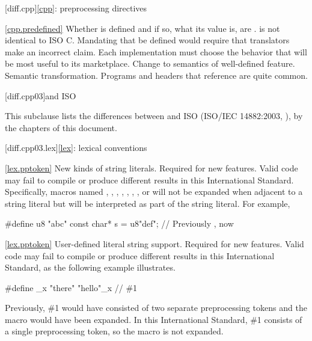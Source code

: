 [diff.cpp]{\ref{cpp}: preprocessing directives}

\ref{cpp.predefined}
\change Whether  is defined and if so, what its value is, are
.
\rationale
\Cpp is not identical to ISO C\@.
Mandating that 
be defined would require that translators make an incorrect claim.
Each implementation must choose the behavior that will be most
useful to its marketplace.
\effect
Change to semantics of well-defined feature.
\difficulty
Semantic transformation.
\howwide
Programs and headers that reference  are
quite common.

[diff.cpp03]{\Cpp and ISO \CppIII}

\pnum
{}%
This subclause lists the differences between \Cpp and
ISO \CppIII (ISO/IEC 14882:2003, ),
by the chapters of this document.

[diff.cpp03.lex]{\ref{lex}: lexical conventions}

\ref{lex.pptoken}
\change New kinds of string literals.
\rationale Required for new features.
\effect
Valid \CppIII code may fail to compile or produce different results in
this International Standard. Specifically, macros named , ,
, , , , , or  will
not be expanded when adjacent to a string literal but will be interpreted as
part of the string literal. For example,

\begin{codeblock}
#define u8 "abc"
const char* s = u8"def";        // Previously , now 
\end{codeblock}

\ref{lex.pptoken}
\change User-defined literal string support.
\rationale Required for new features.
\effect
Valid \CppIII code may fail to compile or produce different results in
this International Standard, as the following example illustrates.

\begin{codeblock}
#define _x "there"
"hello"_x         // \#1
\end{codeblock}

Previously, \#1 would have consisted of two separate preprocessing tokens and
the macro  would have been expanded. In this International Standard,
\#1 consists of a single preprocessing token, so the macro is not expanded.


